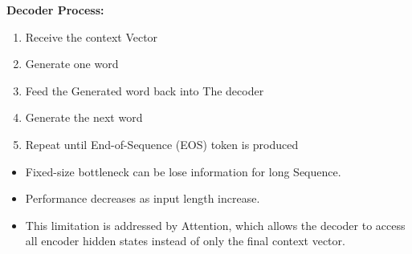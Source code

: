 \textbf{Decoder Process:}
\begin{enumerate}
    \item Receive the context Vector
    \item Generate one word
    \item Feed the Generated word back into The decoder
    \item Generate the next word
    \item Repeat until End-of-Sequence (EOS) token is produced
\end{enumerate}

\begin{advbox}[Limitation]
\begin{itemize}
    \item Fixed-size bottleneck can be lose information for long Sequence.
    \item Performance decreases as input length increase.
    \item This limitation is addressed by Attention, which allows the decoder to access all encoder hidden states instead of only the final context vector.
\end{itemize}
\end{advbox}



